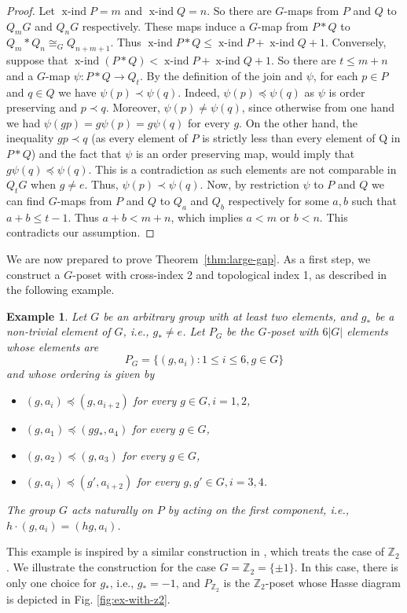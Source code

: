 \documentclass[preprint,12pt]{article}
\renewcommand{\le}{\leqslant}
\newtheorem{example}[theorem]{Example}
\theoremstyle{definition}
\theoremstyle{remark}
\numberwithin{equation}{section}
\DeclareMathOperator{\xind}{x-ind}
\begin{document}
\begin{proof}
Let $\xind P = m$ and $\xind Q = n$. So there are $G$-maps from $P$ and $Q$ to $Q_mG$ and $Q_nG$ respectively. These maps induce a $G$-map from $P\ast Q$ to $Q_m\ast Q_n\cong_{G} Q_{n+m+1}$. Thus $\xind P\ast Q\le \xind P+ \xind Q +1$.  Conversely, suppose that $\xind(P\ast Q) < \xind P+ \xind Q +1$. So there are $t\le m+n$  and a $G$-map
$\psi : P\ast Q\to Q_t$. By the definition of the join and $\psi $, for each $p\in P$ and  $q\in Q$ we have $\psi (p) \prec \psi(q)$. Indeed, $\psi (p) \preceq \psi(q)$ as $\psi$ is order preserving and $p\prec q$. Moreover, $\psi (p) \neq \psi(q)$, since otherwise from one hand we had
$\psi(gp)=g\psi(p)=g\psi(q)$ for every $g$. On the other hand, the inequality $gp \prec q$ (as every element of $P$ is strictly less than every element of Q in $P\ast Q$) and the fact that $\psi$ is an order preserving map, would imply that $g\psi(q)\preceq \psi(q)$. This is a contradiction as such elements are not comparable in $Q_tG$ when $g\ne e$. Thus,  $\psi (p) \prec \psi(q)$. Now, by restriction $\psi$ to $P$ and $Q$ we can find $G$-maps from $P$ and $Q$ to $Q_a$ and $Q_b$ respectively for some $a,b$ such that $a+b\le t-1$. Thus $a+b < m+n$, which implies $a < m$ or $b < n$. This contradicts our assumption.
\end{proof}

We are now prepared to prove Theorem~\ref{thm:large-gap}. As a first step, we construct a $G$-poset with cross-index 2 and topological index 1, as described in the following example.
\begin{example}\label{ex:21}
Let $G$ be an arbitrary group with at least two elements, and $g_*$ be a non-trivial element of $G$, i.e., $g_*\neq e$. Let  $P_G$ be the $G$-poset with $6|G|$ elements whose elements are
\[P_G=\{(g, a_i) : 1\le i\le 6, g\in G \}\]
and whose ordering is given by
\begin{itemize}
    \item $(g, a_i) \preceq  (g, a_{i+2})$ for every $g\in G, i=1,2$,
    \item $(g, a_1) \preceq  (gg_{*}, a_{4})$ for every $g\in G$,
    \item $(g, a_2) \preceq  (g, a_{3})$ for every $g\in G$,
    \item $(g, a_i) \preceq  (g', a_{i+2})$ for every $g, g'\in G, i=3,4$.
\end{itemize}
The group $G$ acts naturally on $P$ by acting on the first component, i.e., $h\cdot(g, a_i)=(hg, a_i)$.
\end{example}
This example is inspired by a similar construction in \cite[Theorem 9]{Sim}, which treats the case of $\mathbb{Z}_2$. 
We illustrate the construction for the case $G=\mathbb{Z}_2=\{\pm 1\}$. In this case, there is only one choice for $g_{*}$, i.e., $g_{*}=-1$, and $P_{\mathbb{Z}_2}$ is the $\mathbb{Z}_2$-poset whose Hasse diagram is depicted in Fig. \ref{fig:ex-with-z2}. 
\end{document}
